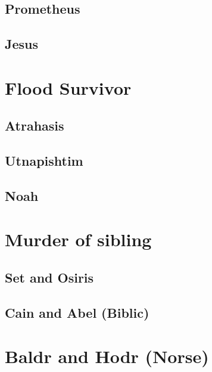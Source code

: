 \documentclass[
]{book}
\begin{document}
\hypertarget{prometheus}{%
\subsection{Prometheus}\label{prometheus}}

\hypertarget{jesus}{%
\subsection{Jesus}\label{jesus}}

\hypertarget{flood-survivor}{%
\section{Flood Survivor}\label{flood-survivor}}

\hypertarget{atrahasis}{%
\subsection{Atrahasis}\label{atrahasis}}

\hypertarget{utnapishtim}{%
\subsection{Utnapishtim}\label{utnapishtim}}

\hypertarget{noah}{%
\subsection{Noah}\label{noah}}

\hypertarget{murder-of-sibling}{%
\section{Murder of sibling}\label{murder-of-sibling}}

\hypertarget{set-and-osiris}{%
\subsection{Set and Osiris}\label{set-and-osiris}}

\hypertarget{cain-and-abel-biblic}{%
\subsection{Cain and Abel (Biblic)}\label{cain-and-abel-biblic}}

\hypertarget{baldr-and-hodr-norse}{%
\section{Baldr and Hodr (Norse)}\label{baldr-and-hodr-norse}}
\end{document}

